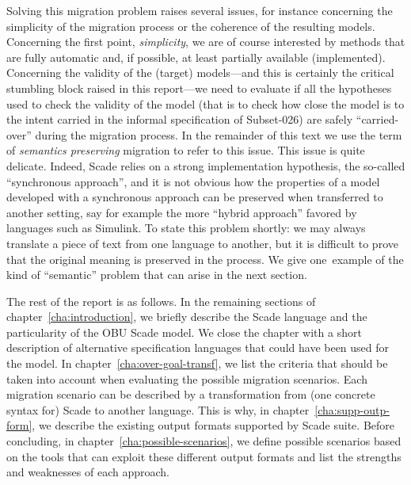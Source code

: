 \documentclass{template/openetcs_report}
\begin{document}
Solving this migration problem raises several issues, for instance
concerning the simplicity of the migration process or the coherence of
the resulting models. Concerning the first point, \emph{simplicity},
we are of course interested by methods that are fully automatic and,
if possible, at least partially available (implemented). Concerning
the validity of the (target) models---and this is certainly the
critical stumbling block raised in this report---we need to evaluate
if all the hypotheses used to check the validity of the model (that is
to check how close the model is to the intent carried in the informal
specification of Subset-026) are safely ``carried-over'' during the
migration process. In the remainder of this text we use the term of
\emph{semantics preserving} migration to refer to this issue. This
issue is quite delicate. Indeed, Scade relies on a strong
implementation hypothesis, the so-called ``synchronous approach'', and
it is not obvious how the properties of a model developed with a
synchronous approach can be preserved when transferred to another
setting, say for example the more ``hybrid approach'' favored by
languages such as Simulink. To state this problem shortly: we may
always translate a piece of text from one language to another, but it
is difficult to prove that the original meaning is preserved in the
process. We give one\ example of the kind of ``semantic'' problem that
can arise in the next section.

The rest of the report is as follows. In the remaining sections of
chapter~\ref{cha:introduction}, we briefly describe the Scade language
and the particularity of the OBU Scade model. We close the chapter
with a short description of alternative specification languages that
could have been used for the model. In
chapter~\ref{cha:over-goal-transf}, we list the criteria that should
be taken into account when evaluating the possible migration
scenarios. Each migration scenario can be described by a
transformation from (one concrete syntax for) Scade to another
language. This is why, in chapter~\ref{cha:supp-outp-form}, we
describe the existing output formats supported by Scade suite. Before
concluding, in chapter~\ref{cha:possible-scenarios}, we define
possible scenarios based on the tools that can exploit these different
output formats and list the strengths and weaknesses of each approach.

\end{document}
